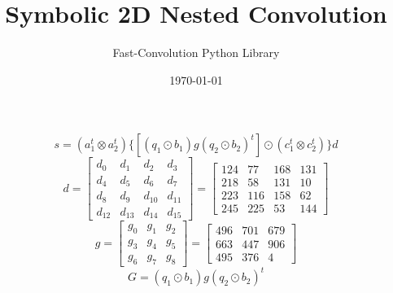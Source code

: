 \documentclass{article}%
\title{Symbolic 2D Nested Convolution}%
\author{Fast{-}Convolution Python Library}%
\date{\today}%
\begin{document}
%
\normalsize%
\maketitle%
\[%
s=(a_1^t \otimes a_2^t) \{[(q_1 \odot b_1) g (q_2 \odot b_2)^t] \odot (c_1^t \otimes c_2^t)\} d%
\]%
\[%
d = \left[\begin{matrix}d_{0} & d_{1} & d_{2} & d_{3}\\d_{4} & d_{5} & d_{6} & d_{7}\\d_{8} & d_{9} & d_{10} & d_{11}\\d_{12} & d_{13} & d_{14} & d_{15}\end{matrix}\right] = \left[\begin{matrix}124 & 77 & 168 & 131\\218 & 58 & 131 & 10\\223 & 116 & 158 & 62\\245 & 225 & 53 & 144\end{matrix}\right]%
\]%
\[%
g = \left[\begin{matrix}g_{0} & g_{1} & g_{2}\\g_{3} & g_{4} & g_{5}\\g_{6} & g_{7} & g_{8}\end{matrix}\right] = \left[\begin{matrix}496 & 701 & 679\\663 & 447 & 906\\495 & 376 & 4\end{matrix}\right]%
\]%
\[%
G = (q_1 \odot b_1) g (q_2 \odot b_2)^t%
\]%
\end{document}
